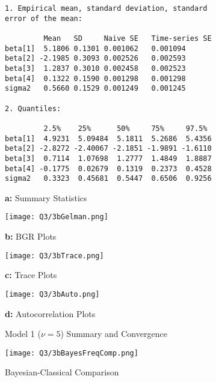 \documentclass{article}
\begin{document}
\begin{figure}[!h]
    \begin{minipage}[l]{0.5\textwidth}
        \begin{Verbatim}[frame = single]
1. Empirical mean, standard deviation, standard 
error of the mean:

         Mean   SD     Naive SE   Time-series SE
beta[1]  5.1806 0.1301 0.001062   0.001094
beta[2] -2.1985 0.3093 0.002526   0.002593
beta[3]  1.2837 0.3010 0.002458   0.002523
beta[4]  0.1322 0.1590 0.001298   0.001298
sigma2   0.5660 0.1529 0.001249   0.001245

2. Quantiles:

         2.5%    25%      50%     75%     97.5%
beta[1]  4.9231  5.09484  5.1811  5.2686  5.4356
beta[2] -2.8272 -2.40067 -2.1851 -1.9891 -1.6110
beta[3]  0.7114  1.07698  1.2777  1.4849  1.8887
beta[4] -0.1775  0.02679  0.1319  0.2373  0.4528
sigma2   0.3323  0.45681  0.5447  0.6506  0.9256
        \end{Verbatim}
        \centerline{\textbf{a:} Summary Statistics}\label{res1}
    \end{minipage}
    \begin{minipage}[pos=r]{0.5\textwidth}
        \texttt{[image: Q3/3bGelman.png]}
        \centerline{\textbf{b:} BGR Plots}
    \end{minipage}
    
    
    \begin{minipage}[pos=l]{0.5\textwidth}
        \texttt{[image: Q3/3bTrace.png]}
        \centerline{\textbf{c:} Trace Plots}
    \end{minipage}
    \begin{minipage}[pos=r]{0.5\textwidth}
        \texttt{[image: Q3/3bAuto.png]}
        \centerline{\textbf{d:} Autocorrelation Plots}
    \end{minipage}
        
\caption{Model 1 ($\nu = 5$) Summary and Convergence} \label{Fig3c}
\end{figure}
\begin{figure}[!h]
\centering
\texttt{[image: Q3/3bBayesFreqComp.png]}
\caption{Bayesian-Classical Comparison} \label{Fig3BayesFreqComp}
\end{figure}

\newpage
\end{document}

